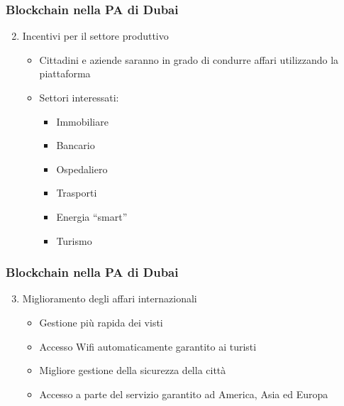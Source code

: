 \begin{frame}
 \frametitle{Blockchain nella PA di Dubai}

 \begin{enumerate}
 \setcounter{enumi}{1}
  \item<1-> Incentivi per il settore produttivo
  \begin{itemize}
   \item<2-> Cittadini e aziende saranno in grado di condurre affari
utilizzando la piattaforma
   \item<3-> Settori interessati:
   \begin{itemize}
    \item Immobiliare
    \item Bancario
    \item Ospedaliero
    \item Trasporti
    \item Energia ``smart''
    \item Turismo

   \end{itemize}

  \end{itemize}

 \end{enumerate}

\end{frame}

\begin{frame}
 \frametitle{Blockchain nella PA di Dubai}

 \begin{enumerate}
 \setcounter{enumi}{2}
  \item<1-> Miglioramento degli affari internazionali
  \begin{itemize}
   \item<2-> Gestione pi\`u rapida dei visti
   \item<3-> Accesso Wifi automaticamente garantito ai turisti
   \item<4-> Migliore gestione della sicurezza della citt\`a
   \item<5-> Accesso a parte del servizio garantito ad America, Asia ed Europa
  \end{itemize}

 \end{enumerate}

\end{frame}
